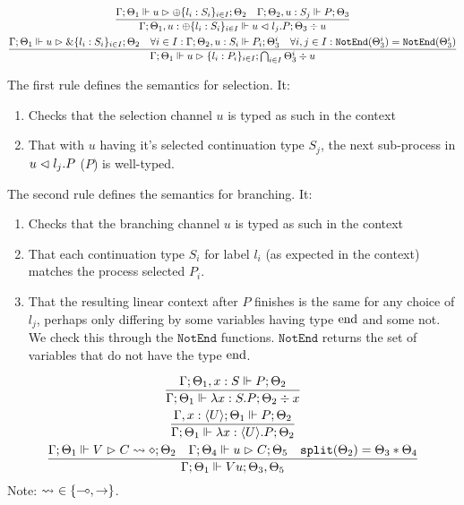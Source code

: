 \begin{gather*}
\frac{\Gamma ; \Theta_1 \Vdash u \vartriangleright \oplus \{l_i : S_i\}_{i\in I}; \Theta_2 \quad \Gamma ; \Theta_2 , u : S_j \Vdash P ; \Theta_3}{\Gamma ; \Theta_1 , u : \oplus\{l_i : S_i\}_{i \in I} \Vdash u \vartriangleleft l_j . P ; \Theta_3 \div u} \\
\frac{\Gamma ; \Theta_1 \Vdash u \vartriangleright \& \{l_i : S_i\}_{i \in I}; \Theta_2 \quad \forall i \in I :\Gamma ; \Theta_2 , u : S_i \Vdash P_i ; \Theta^i_3 \quad \forall i,j \in I : \texttt{NotEnd}(\Theta^i_3) = \texttt{NotEnd}(\Theta_3^i)}{\Gamma ; \Theta_1 \Vdash u \vartriangleright \{l_i : P_i\}_{i \in I} ; \bigcap_{i \in I} \Theta_3^i \div u} \\
\end{gather*}

The first rule defines the semantics for selection. It:
\begin{enumerate}
    \item Checks that the selection channel $u$ is typed as such in the context
    \item That with $u$ having it's selected continuation type $S_j$, the next sub-process in $u \vartriangleleft l_j . P$ ($P$) is well-typed.
\end{enumerate}

The second rule defines the semantics for branching. It:
\begin{enumerate}
    \item Checks that the branching channel $u$ is typed as such in the context
    \item That each continuation type $S_i$ for label $l_i$ (as expected in the context) matches the process selected $P_i$.
    \item That the resulting linear context after $P$ finishes is the same for any choice of $l_j$, perhaps only differing by some variables having type $\text{end}$ and some not. We check this through the $\texttt{NotEnd}$ functions.  $\texttt{NotEnd}$ returns the set of variables that do not have the type $\text{end}$. 
\end{enumerate}

\begin{gather*}
\frac{\Gamma ; \Theta_1 , x : S \Vdash P ; \Theta_2}{\Gamma ; \Theta_1 \Vdash \lambda x : S . P ; \Theta_2 \div x} \\
\frac{\Gamma, x : \langle U \rangle ; \Theta_1 \Vdash P ; \Theta_2}{\Gamma ; \Theta_1 \Vdash \lambda x : \langle U \rangle . P ; \Theta_2} \\
\frac{\Gamma ; \Theta_1 \Vdash V \vartriangleright C \leadsto \diamond ; \Theta_2 \quad \Gamma ; \Theta_4 \Vdash u \vartriangleright C ; \Theta_5 \quad \texttt{split}(\Theta_2) = \Theta_3 * \Theta_4}{\Gamma ; \Theta_1 \Vdash V u ; \Theta_3 , \Theta_5}
\end{gather*}
Note: $\leadsto\ \in \{\multimap, \rightarrow\}$.

